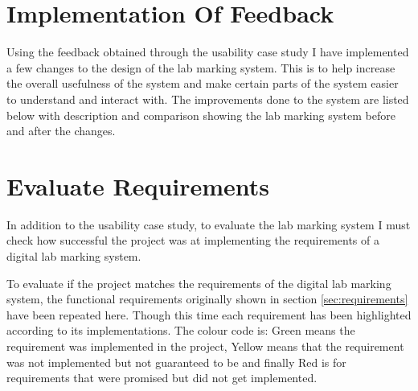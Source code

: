 \documentclass[11pt]{report}
\begin{document}
\section{Implementation Of Feedback}

Using the feedback obtained through the usability case study I  have implemented a few changes to the design of the lab marking system. This is to help increase the overall usefulness of the system and make certain parts of the system easier to understand and interact with. The improvements done to the system are listed below with description and comparison showing the lab marking system before and after the changes.  


\section{Evaluate Requirements}

In addition to the usability case study, to evaluate the lab marking system I must check how successful the project was at implementing the requirements of a digital lab marking system. 

To evaluate if the project matches the requirements of the digital lab marking system, the functional requirements originally shown in section \ref{sec:requirements} have been repeated here. Though this time each requirement has been highlighted according to its implementations. The colour code is: Green means the requirement was implemented in the project, Yellow means that the requirement was not implemented but not guaranteed to be and finally Red is for requirements that were promised but did not get implemented.   
\end{document}
